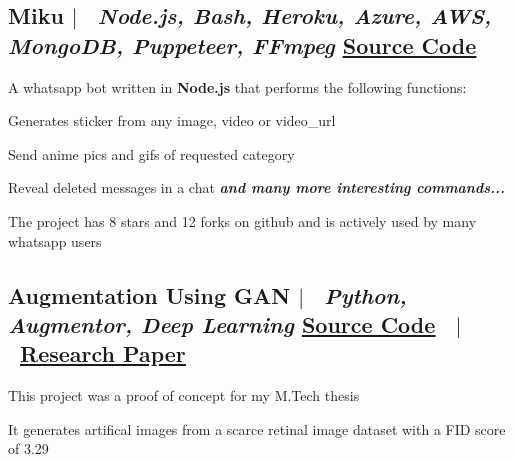 \documentclass[10pt]{article}
\begin{document}
\subsection*{
  Miku 
  $|$
  \normalsize \normalfont \ \textit{Node.js, Bash, Heroku, Azure, AWS, MongoDB, Puppeteer, FFmpeg}
  \hfill 
  \normalsize \underline{\href{https://github.com/HARSH-SHETH/miku}{Source Code}}
}
  A whatsapp bot written in \textbf{Node.js} that performs the following functions: 
  \begin{description}
    \setlength{\itemsep}{0em}
    \setlength{\itemindent}{2\parindent}
    \item[$\bullet$]{Generates sticker from any image, video or video\_url}
    \item[$\bullet$]{ Send anime pics and gifs of requested category}
    \item[$\bullet$]{ Reveal deleted messages in a chat \emph{\textbf{and many more interesting commands...}}}
    \item[$\bullet$]{The project has 8 stars and 12 forks on github and is actively used by many whatsapp users}
  \end{description}

\subsection*{
  Augmentation Using GAN
  $|$ 
  \normalsize \normalfont \ \textit{Python, Augmentor, Deep Learning}
  \hfill
  \normalsize \underline{\href{https://colab.research.google.com/drive/1xpEySf_EDrDfJiunTFyRCtO-xXb8KKOq?usp=sharing}{Source Code}}
  \ $|$ \ 
  \normalsize \underline{\href{https://www.overleaf.com/read/gvmgrdwwvcrx}{Research Paper}}
}
  \begin{description}
    \setlength{\itemsep}{0em}
    \setlength{\itemindent}{2\parindent}
    \item[$\bullet$]{This project was a proof of concept for my M.Tech thesis}
    \item[$\bullet$]{It generates artifical images from a scarce retinal image dataset with a FID score of 3.29}
  \end{description}
\end{document}
